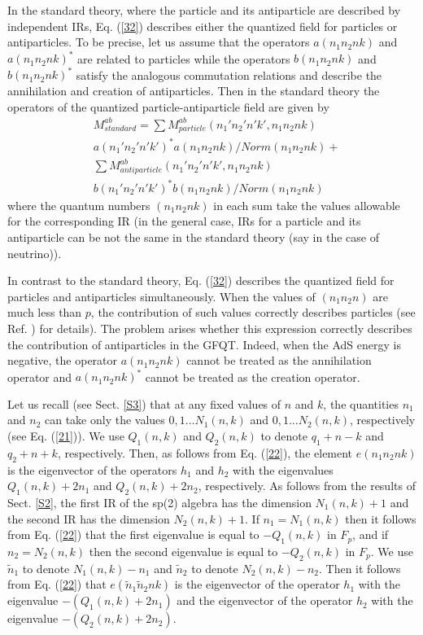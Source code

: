 \documentclass[a4paper,12pt]{article}%
\begin{document}
In the standard theory, where the particle and its 
antiparticle are described by independent IRs, Eq. 
(\ref{32}) describes either the quantized field for
particles or antiparticles. To be precise, let us assume 
that the operators $a(n_1n_2nk)$ and $a(n_1n_2nk)^*$ are related
to particles while the operators $b(n_1n_2nk)$ and
$b(n_1n_2nk)^*$ satisfy the analogous commutation relations
and describe the annihilation and creation of antiparticles.
Then in the standard theory the operators of the quantized
particle-antiparticle field are given by
\begin{eqnarray}  
&M_{standard}^{ab}=\sum M_{particle}^{ab}
(n_1'n_2'n'k',n_1n_2nk)\nonumber\\
&a(n_1'n_2'n'k')^*a(n_1n_2nk)/Norm(n_1n_2nk)+\nonumber\\
&\sum M_{antiparticle}^{ab}(n_1'n_2'n'k',n_1n_2nk)\nonumber\\
&b(n_1'n_2'n'k')^*b(n_1n_2nk)/Norm(n_1n_2nk)
\label{33}
\end{eqnarray}
where the quantum numbers $(n_1n_2nk)$ in each sum take the
values allowable for the corresponding IR (in the general case,
IRs for a particle and its antiparticle can be not the same
in the standard theory (say in the case of neutrino)). 

In contrast to the standard theory, Eq. (\ref{32}) describes
the quantized field for particles and antiparticles 
simultaneously. When the values of $(n_1n_2n)$ are much less
than $p$, the contribution of such values correctly describes
particles (see Ref. \cite{lev2}) for details). The problem 
arises whether this expression correctly describes 
the contribution of antiparticles in the GFQT. Indeed, 
when the AdS energy is negative, the operator $a(n_1n_2nk)$ 
cannot be treated as the annihilation operator and 
$a(n_1n_2nk)^*$ cannot be treated as the creation
operator. 

Let us recall (see Sect. \ref{S3}) that at any fixed
values of $n$ and $k$, the quantities $n_1$ and $n_2$
can take only the values $0,1...N_1(n,k)$ and
$0,1...N_2(n,k)$, respectively (see Eq. (\ref{21})).
We use $Q_1(n,k)$ and $Q_2(n,k)$ to denote $q_1+n-k$
and $q_2+n+k$, respectively. Then, as follows from Eq.
(\ref{22}), the element $e(n_1n_2nk)$ is the eigenvector
of the operators $h_1$ and $h_2$ with the eigenvalues
$Q_1(n,k)+2n_1$ and $Q_2(n,k)+2n_2$, respectively. 
As follows from the results of Sect. \ref{S2}, the first IR
of the sp(2) algebra has the dimension $N_1(n,k)+1$ and the 
second IR has the dimension $N_2(n,k)+1$. If $n_1=N_1(n,k)$ 
then it follows from Eq. (\ref{22}) that the first 
eigenvalue is equal to $-Q_1(n,k)$ in $F_p$, and if 
$n_2=N_2(n,k)$ then 
the second eigenvalue is equal to $-Q_2(n,k)$ in $F_p$.
We use ${\tilde n}_1$ to denote $N_1(n,k)-n_1$ and 
${\tilde n}_2$ to denote 
$N_2(n,k)-n_2$. Then it follows from Eq. (\ref{22}) that
$e({\tilde n}_1{\tilde n}_2nk)$ is the 
eigenvector  
of the operator $h_1$ with the eigenvalue $-(Q_1(n,k)+2n_1)$ 
and the 
eigenvector of the operator $h_2$ with the eigenvalue 
$-(Q_2(n,k)+2n_2)$. 
\end{document}
